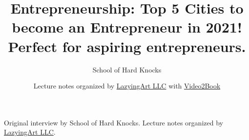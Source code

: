 \documentclass[11pt,oneside]{book}
\begin{document}
\frontmatter
\title{Entrepreneurship: Top 5 Cities to become an Entrepreneur in 2021! Perfect for aspiring entrepreneurs.}
\author{School of Hard Knocks}
\date{Lecture notes organized by \href{https://lazying.art}{LazyingArt LLC} with \href{https://github.com/lachlanchen/Video2Book}{Video2Book}}
\maketitle
\begin{center}
\small Original interview by School of Hard Knocks. Lecture notes organized by \href{https://lazying.art}{LazyingArt LLC}.
\end{center}
\clearpage
\mainmatter

\end{document}
